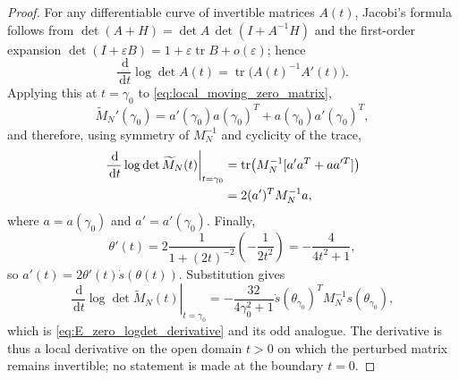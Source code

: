 \documentclass[preprint,12pt]{elsarticle}
\numberwithin{equation}{section}
\theoremstyle{plain}
\theoremstyle{definition}
\theoremstyle{remark}
\newcommand{\dd}{\,\mathrm d}
\begin{document}
\begin{proof}
For any differentiable curve of invertible matrices $A(t)$, Jacobi's formula follows from
$\det(A+H)=\det A\,\det(I+A^{-1}H)$ and the first-order expansion
$\det(I+\varepsilon B)=1+\varepsilon\operatorname{tr}B+o(\varepsilon)$; hence
\begin{equation}
\frac{\dd}{\dd t}\log\det A(t)
=\operatorname{tr}\bigl(A(t)^{-1}A'(t)\bigr).
\end{equation}
Applying this at $t=\gamma_0$ to \eqref{eq:local_moving_zero_matrix},
\begin{equation}
\widetilde M_N'(\gamma_0)
=a'(\gamma_0)a(\gamma_0)^T+a(\gamma_0)a'(\gamma_0)^T,
\end{equation}
and therefore, using symmetry of $M_N^{-1}$ and cyclicity of the trace,
\begin{align}
\left.\frac{\dd}{\dd t}\log\det\widetilde M_N(t)\right|_{t=\gamma_0}
&=\operatorname{tr}\!\left(M_N^{-1}
[a'a^T+aa'^T]\right)\notag\\
&=2(a')^TM_N^{-1}a,
\end{align}
where $a=a(\gamma_0)$ and $a'=a'(\gamma_0)$.  Finally,
\begin{equation}
\theta'(t)
=2\frac{1}{1+(2t)^{-2}}\left(-\frac{1}{2t^2}\right)
=-\frac{4}{4t^2+1},
\label{eq:theta_gamma_derivative}
\end{equation}
so $a'(t)=2\theta'(t)\dot s(\theta(t))$.  Substitution gives
\begin{equation}
\left.\frac{\dd}{\dd t}\log\det\widetilde M_N(t)\right|_{t=\gamma_0}
=-\frac{32}{4\gamma_0^2+1}
\dot s(\theta_{\gamma_0})^TM_N^{-1}s(\theta_{\gamma_0}),
\end{equation}
which is \eqref{eq:E_zero_logdet_derivative} and its odd analogue.  The derivative is thus a local derivative on the open domain $t>0$ on which the perturbed matrix remains invertible; no statement is made at the boundary $t=0$.
\end{proof}
\end{document}

